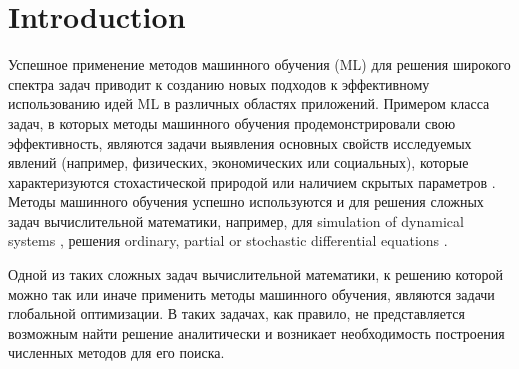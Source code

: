 \documentclass[entropy,article,submit,moreauthors,pdftex]{Definitions/mdpi}
\begin{document}

\section{Introduction}


Успешное применение методов машинного обучения (ML) для решения широкого спектра задач приводит к созданию новых подходов к эффективному использованию идей ML в различных областях приложений. 
Примером класса задач, в которых методы машинного обучения продемонстрировали свою эффективность, являются задачи выявления основных свойств исследуемых явлений (например, физических, экономических или социальных), которые характеризуются стохастической природой или наличием скрытых параметров \cite{Golovenkin2020,Gonoskov2019}.
Методы машинного обучения успешно используются и для решения сложных задач вычислительной математики, например, для simulation of dynamical systems \cite{Seleznev2019}, решения ordinary, partial or stochastic differential equations \cite{Lagaris1998,Blechschmidt2021,Xu2020} .

Одной из таких сложных задач вычислительной математики, к решению которой можно так или иначе применить методы машинного обучения, являются задачи глобальной оптимизации. 
В таких задачах, как правило, не представляется возможным найти решение аналитически и возникает необходимость построения численных методов для его поиска.
\end{document}
